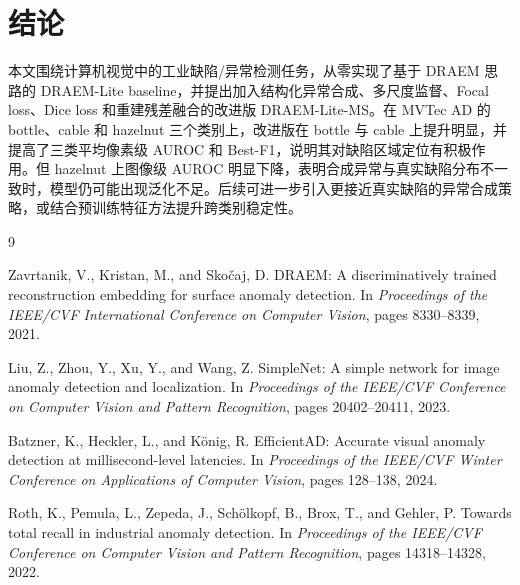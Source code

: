 \documentclass[UTF8,a4paper,twocolumn]{ctexart}
\begin{document}
\section{结论}
本文围绕计算机视觉中的工业缺陷/异常检测任务，从零实现了基于 DRAEM 思路的 DRAEM-Lite baseline，并提出加入结构化异常合成、多尺度监督、Focal loss、Dice loss 和重建残差融合的改进版 DRAEM-Lite-MS。在 MVTec AD 的 bottle、cable 和 hazelnut 三个类别上，改进版在 bottle 与 cable 上提升明显，并提高了三类平均像素级 AUROC 和 Best-F1，说明其对缺陷区域定位有积极作用。但 hazelnut 上图像级 AUROC 明显下降，表明合成异常与真实缺陷分布不一致时，模型仍可能出现泛化不足。后续可进一步引入更接近真实缺陷的异常合成策略，或结合预训练特征方法提升跨类别稳定性。

\begin{thebibliography}{9}

Zavrtanik, V., Kristan, M., and Sko{\v{c}}aj, D.
DRAEM: A discriminatively trained reconstruction embedding for surface anomaly detection.
In \textit{Proceedings of the IEEE/CVF International Conference on Computer Vision}, pages 8330--8339, 2021.

Liu, Z., Zhou, Y., Xu, Y., and Wang, Z.
SimpleNet: A simple network for image anomaly detection and localization.
In \textit{Proceedings of the IEEE/CVF Conference on Computer Vision and Pattern Recognition}, pages 20402--20411, 2023.

Batzner, K., Heckler, L., and K{\"o}nig, R.
EfficientAD: Accurate visual anomaly detection at millisecond-level latencies.
In \textit{Proceedings of the IEEE/CVF Winter Conference on Applications of Computer Vision}, pages 128--138, 2024.

Roth, K., Pemula, L., Zepeda, J., Sch{\"o}lkopf, B., Brox, T., and Gehler, P.
Towards total recall in industrial anomaly detection.
In \textit{Proceedings of the IEEE/CVF Conference on Computer Vision and Pattern Recognition}, pages 14318--14328, 2022.

\end{thebibliography}
\end{document}
